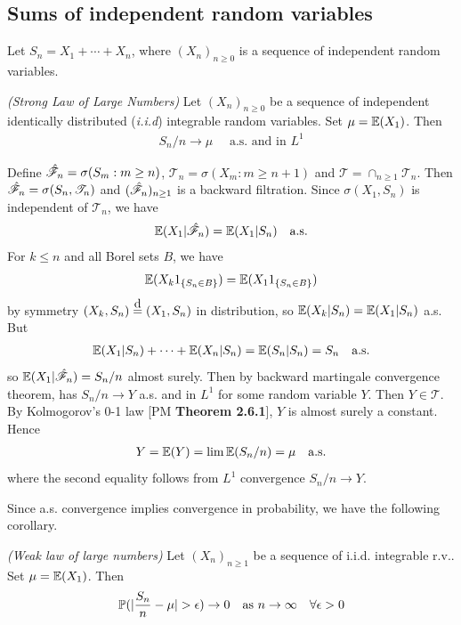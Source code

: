 \documentclass[10pt,a4paper]{report}
\newcommand\xeq{\stackrel{\mathclap{\normalfont\mbox{d}}}{=}}
\newenvironment{proof}
{\begin{changemargin}{1cm}{0.5cm} 
	}%
	{\end{changemargin}
}
\begin{document}
\subsection*{Sums of independent random variables}

\newcommand{\T}{\mathscr{T}}

Let $S_n = X_1 + \cdots + X_n$, where $(X_n)_{n\geq 0}$ is a sequence of independent random variables.
\s

 \emph{(Strong Law of Large Numbers)} Let $(X_n)_{n\geq 0}$ be a sequence of independent identically distributed (\emph{i.i.d}) integrable random variables. Set $\mu = \mathbb{E}(X_{1})$. Then
\begin{align*}
S_n / n \rightarrow \mu \quad \text{ a.s. and in } L^1
\end{align*}
\begin{proof}
\pf Define $\hat{\mathscr{F}}_n = \sigma(S_m : m\geq n)$, $\T_n = \sigma(X_m : m\geq n+1)$ and $\T = \cap_{n\geq 1} \T_n$. Then $\hat{\F}_n = \sigma(S_n, \T_n)$ and $(\hat{\mathscr{F}}_n)_{n\geq 1}$ is a backward filtration. Since $\sigma(X_1, S_n)$ is independent of $\T_n$, we have
\begin{align*}
\mathbb{E}(X_1 |\hat{\mathscr{F}}_n) = \mathbb{E}(X_1 |S_n) \quad \text{a.s.}
\end{align*} 
For $k\leq n$ and all Borel sets $B$, we have
\begin{align*}
\mathbb{E}(X_k 1_{ \{S_n \in B \} }) = \mathbb{E}(X_1 1_{\{S_n \in B \} })
\end{align*}
by symmetry $(X_k, S_n) \xeq (X_1, S_n)$ in distribution, so $\mathbb{E}(X_k | S_n) = \mathbb{E}(X_1 |S_n)$ a.s. But
\begin{align*}
\mathbb{E}(X_1 |S_n)+ \cdots + \mathbb{E}(X_n|S_n) = \mathbb{E}(S_n |S_n) = S_n \quad \text{a.s.}
\end{align*} 
so $\mathbb{E}(X_1 |\hat{\mathscr{F}}_n) = S_n /n$ almost surely. Then by backward martingale convergence theorem, has $S_n/n\rightarrow Y$ a.s. and in $L^1$ for some random variable $Y$. Then $Y\in \T$. By Kolmogorov's 0-1 law [PM \textbf{Theorem 2.6.1}], $Y$ is almost surely a constant. Hence
\begin{align*}
Y = \mathbb{E}(Y) = \lim \mathbb{E}(S_n/n) = \mu \quad \text{a.s.}
\end{align*}
where the second equality follows from $L^1$ convergence $S_n/n\rightarrow Y$.

\eop
\end{proof}
\s

Since a.s. convergence implies convergence in probability, we have the following corollary.
\s

 \emph{(Weak law of large numbers)} Let $(X_n)_{n\geq 1}$ be a sequence of i.i.d. integrable r.v.. Set $\mu =\mathbb{E}(X_1)$. Then 
\begin{align*}
\mathbb{P}(|\frac{S_n}{n} -\mu| > \epsilon) \rightarrow 0 \quad \text{as } n\rightarrow \infty \quad \forall \epsilon >0
\end{align*}
\end{document}

